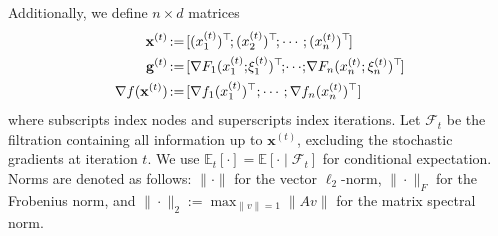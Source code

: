 \documentclass[10pt]{article}
\newcommand{\vg}{{\mathbf{g}}}
\newcommand{\vx}{{\mathbf{x}}}
\newcommand{\cF}{{\mathcal{F}}}
\newcommand{\EE}{\mathbb{E}}
\begin{document}
Additionally, we define \(n \times d\) matrices
\begin{align*}
                \vx^{(t)} &\hspace{-0.5mm}:=\hspace{-0.5mm} [( {x}_1^{(t)})^\top\hspace{-0.5mm}; ( {x}_2^{(t)})^\top\hspace{-0.5mm}; \cdots; ( {x}_n^{(t)})^\top\hspace{-0.5mm}]  \\
\hspace{-0.5mm} \vg^{(t)} &\hspace{-0.5mm}:=\hspace{-0.5mm} [\nabla F_1( {x}_1^{(t)};\hspace{-0.5mm}\xi_1^{(t)})^\top\hspace{-0.5mm};\hspace{-0.5mm} \cdots\hspace{-0.5mm};\hspace{-0.5mm} \nabla F_n( {x}_n^{(t)};\xi_n^{(t)})^\top\hspace{-0.5mm}] \\
\nabla f(\vx^{(t)}) &\hspace{-0.5mm}:=\hspace{-0.5mm} [\nabla f_1({x}^{(t)}_1)^\top;
\cdots;\nabla f_n({  x}^{(t)}_n)^\top] 
\end{align*}
where subscripts index nodes and superscripts index iterations. Let $\cF_t$ be the filtration containing all information up to $\vx^{(t)}$, excluding the stochastic gradients at iteration $t$. We use $\EE_t[\cdot]=\EE[\cdot\mid \cF_t]$ for conditional expectation. Norms are denoted as follows: $\|\cdot\|$ for the vector $\ell_2$-norm, $\|\cdot\|_F$ for the Frobenius norm, and $\|\cdot\|_2 := \max_{\|v\|=1}\|Av\|$ for the matrix spectral norm.
\end{document}
